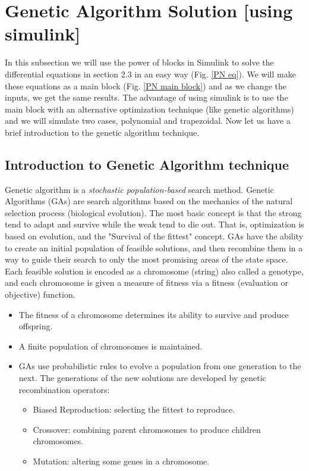
\section{Genetic Algorithm Solution [using simulink]}


In this subsection we will use the power of blocks in Simulink to solve the differential equations in section 2.3 in an easy way (Fig. \ref{PN eq}). We will make these equations as a main block (Fig. \ref{PN main block}) and as we change the inputs, we get the same results. The advantage of using simulink is to use the main block with an alternative optimization technique (like genetic algorithms) and we will simulate two cases, polynomial and trapezoidal. Now let us have a brief introduction to the genetic algorithm technique.

\subsection{Introduction to Genetic Algorithm technique}
Genetic algorithm is a \textit{stochastic population-based} search method. Genetic Algorithms (GAs) are   search algorithms based on the mechanics of the natural selection process (biological evolution).  The most basic concept is that the strong tend to adapt and survive while the weak tend to die out. That is, optimization is based on evolution, and the "Survival of the fittest" concept.
GAs have the ability to create an initial population of feasible solutions, and then recombine them in a way to guide their search to only the most promising areas of the state space.   
Each feasible solution is encoded as a chromosome (string) also called a genotype, and each chromosome is given a measure of fitness via a fitness (evaluation or objective) function. 

\begin{itemize}
	\item The fitness of a chromosome determines its ability to survive and produce offspring.
	\item A finite population of chromosomes is maintained.
	\item GAs  use  probabilistic  rules  to  evolve  a  population from  one  generation to the next.  The generations of the new solutions are developed by genetic recombination operators:
	\begin{itemize}
		\item Biased Reproduction: selecting the fittest to reproduce.
		\item Crossover: combining parent chromosomes to produce children chromosomes.
		\item Mutation: altering some genes in a chromosome.
	\end{itemize}
\end{itemize}

